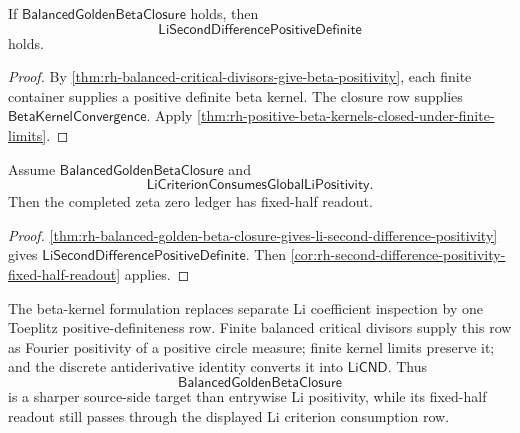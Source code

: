 \begin{theorem}
\label{thm:rh-balanced-golden-beta-closure-gives-li-second-difference-positivity}
If $\mathsf{BalancedGoldenBetaClosure}$ holds, then
$$
\mathsf{LiSecondDifferencePositiveDefinite}
$$
holds.
\end{theorem}

\begin{proof}
By
\autoref{thm:rh-balanced-critical-divisors-give-beta-positivity}, each
finite container supplies a positive definite beta kernel.  The closure
row supplies $\mathsf{BetaKernelConvergence}$.  Apply
\autoref{thm:rh-positive-beta-kernels-closed-under-finite-limits}.
\end{proof}

\begin{corollary}
\label{cor:rh-balanced-golden-beta-closure-fixed-half-readout}
Assume $\mathsf{BalancedGoldenBetaClosure}$ and
$$
\mathsf{LiCriterionConsumesGlobalLiPositivity}.
$$
Then the completed zeta zero ledger has fixed-half readout.
\end{corollary}

\begin{proof}
\autoref{thm:rh-balanced-golden-beta-closure-gives-li-second-difference-positivity}
gives $\mathsf{LiSecondDifferencePositiveDefinite}$.  Then
\autoref{cor:rh-second-difference-positivity-fixed-half-readout}
applies.
\end{proof}

\begin{principle}
\label{prin:rh-beta-closure-as-toeplitz-li-weil-positivity}
The beta-kernel formulation replaces separate Li coefficient inspection
by one Toeplitz positive-definiteness row.  Finite balanced critical
divisors supply this row as Fourier positivity of a positive circle
measure; finite kernel limits preserve it; and the discrete
antiderivative identity converts it into $\mathsf{LiCND}$.  Thus
$$
\mathsf{BalancedGoldenBetaClosure}
$$
is a sharper source-side target than entrywise Li positivity, while
its fixed-half readout still passes through the displayed Li criterion
consumption row.
\end{principle}
